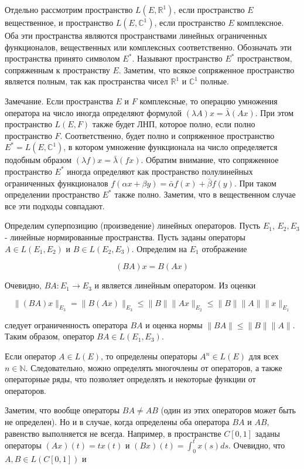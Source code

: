 Отдельно рассмотрим пространство $L\left(E, \mathbb{R}^{1}\right)$, если пространство $E$ вещественное, и пространство $L\left(E, \mathbb{C}^{1}\right)$, если пространство $E$ комплексное. Оба эти пространства являются пространствами линейных ограниченных функционалов, вещественных или комплексных соответственно. Обозначать эти пространства принято символом $E^{*}$. Называют пространство $E^{*}$ пространством, сопряженным к пространству $E$. Заметим, что всякое сопряженное пространство является полным, так как пространства чисел $\mathbb{R}^{1}$ и $\mathbb{C}^{1}$ полные.

Замечание. Если пространства $E$ и $F$ комплексные, то операцию умножения оператора на число иногда определяют формулой $(\lambda A) x=\bar{\lambda}(A x)$. При этом пространство $L(E, F)$ также будет ЛНП, которое полно, если полно пространство $F$. Соответственно, будет полно и сопряженное пространство $E^{*}=L\left(E, \mathbb{C}^{1}\right)$, в котором умножение функционала на число определяется подобным образом $(\lambda f) x=\bar{\lambda}(f x)$. Обратим внимание, что сопряженное пространство $E^{*}$ иногда определяют как пространство полулинейных ограниченных функционалов $f(\alpha x+\beta y)=\bar{\alpha} f(x)+\bar{\beta} f(y)$. При таком определении пространство $E^{*}$ также полно. Заметим, что в вещественном случае все эти подходы совпадают.

Определим суперпозицию (произведение) линейных операторов. Пусть $E_{1}$, $E_{2}, E_{3}$ - линейные нормированные пространства. Пусть заданы операторы $A \in L\left(E_{1}, E_{2}\right)$ и $B \in L\left(E_{2}, E_{3}\right)$. Определим на $E_{1}$ отображение

$$
	(B A) x=B(A x)
$$

Очевидно, $B A: E_{1} \rightarrow E_{3}$ и является линейным оператором. Из оценки

$$
	\|(B A) x\|_{E_{3}}=\|B(A x)\|_{E_{3}} \leq\|B\|\|A x\|_{E_{2}} \leq\|B\|\|A\|\|x\|_{E_{1}}
$$

следует ограниченность оператора $B A$ и оценка нормы $\|B A\| \leq\|B\|\|A\|$. Таким образом, оператор $B A \in L\left(E_{1}, E_{3}\right)$.

Если оператор $A \in L(E)$, то определены операторы $A^{n} \in L(E)$ для всех $n \in \mathbb{N}$. Следовательно, можно определять многочлены от операторов, а также операторные ряды, что позволяет определять и некоторые функции от операторов.

Заметим, что вообще операторы $B A \neq A B$ (один из этих операторов может быть не определен). Но и в случае, когда определены оба оператора $B A$ и $A B$, равенство выполняется не всегда. Например, в пространстве $C[0,1]$ заданы операторы $(A x)(t)=t x(t)$ и $(B x)(t)=\int_{0}^{t} x(s) d s$. Очевидно, что $A, B \in L(C[0,1])$ и

